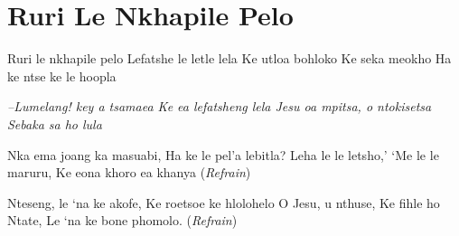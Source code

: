 \starttocol
\chapter{Ruri Le Nkhapile Pelo}
\nexttocol
\hfill{\it }
\stoptocol
\starttocol
\startlines
{\sc Ruri} le nkhapile pelo
Lefatshe le letle lela
Ke utloa bohloko
Ke seka meokho
Ha ke ntse ke le hoopla	

{\it --Lumelang!  key a tsamaea
Ke ea lefatsheng lela
Jesu oa mpitsa, o ntokisetsa 
Sebaka sa ho lula}

Nka ema joang ka masuabi,
Ha ke le pel'a lebitla?
Leha le le letsho,'
`Me le le maruru,
Ke eona khoro ea khanya
          \hfill({\it Refrain})~~~~~~~~~

Nteseng, le `na ke akofe,
Ke roetsoe ke hlolohelo
O Jesu,  u nthuse,
Ke fihle ho Ntate,
Le `na ke bone phomolo.
          \hfill({\it Refrain})~~~~~~~~~

\stoplines
\nexttocol

\stoptocol
